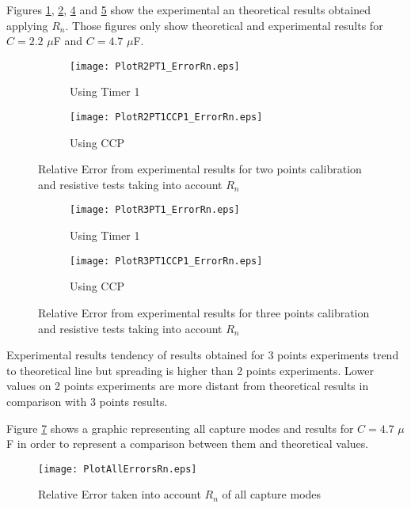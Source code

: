Figures \ref{fig:PlotR2PT1ErrorRn}, \ref{fig:PlotR2PT1CCP1ErrorRn}, \ref{fig:PlotR3PT1ErrorRn} and \ref{fig:PlotR3PT1CCP1ErrorRn} show the experimental an theoretical results obtained applying $R_{n}$. Those figures only show theoretical and experimental results for $C=2.2$ $\mu$F and $C=4.7$ $\mu$F.
\medskip

\begin{figure}[H]
\centering
	\begin{subfigure}{0.75\textwidth}
	\texttt{[image: PlotR2PT1\_ErrorRn.eps]}
	\caption{Using Timer 1}
	\label{fig:PlotR2PT1ErrorRn}
	\end{subfigure}
	\begin{subfigure}{0.75\textwidth}
	\texttt{[image: PlotR2PT1CCP1\_ErrorRn.eps]}
	\caption{Using CCP}
	\label{fig:PlotR2PT1CCP1ErrorRn}
	\end{subfigure}
\caption{Relative Error from experimental results for two points calibration and resistive tests taking into account $R_{n}$}
\label{fig:RelativeErrorRnResistive2P}
\end{figure}

\begin{figure}[H]
\centering
    \begin{subfigure}{0.75\textwidth}
	\texttt{[image: PlotR3PT1\_ErrorRn.eps]}
	\caption{Using Timer 1}
	\label{fig:PlotR3PT1ErrorRn}
	\end{subfigure}
	\begin{subfigure}{0.75\textwidth}
	\texttt{[image: PlotR3PT1CCP1\_ErrorRn.eps]}
	\caption{Using CCP}
	\label{fig:PlotR3PT1CCP1ErrorRn}
	\end{subfigure}
\caption{Relative Error from experimental results for three points calibration and resistive tests taking into account $R_{n}$}
\label{fig:RelativeErrorRnResistive3P}
\end{figure}

Experimental results tendency of results obtained for 3 points experiments trend to theoretical line but spreading is higher than 2 points experiments. Lower values on 2 points experiments are more distant from theoretical results in comparison with 3 points results.
\medskip

Figure \ref{fig:PlotAllErrorsRn} shows a graphic representing all capture modes and results for $C=4.7$ $\mu$F in order to represent a comparison between them and theoretical values.

\begin{figure}[H]
\centering
\texttt{[image: PlotAllErrorsRn.eps]}
\caption{Relative Error taken into account $R_{n}$ of all capture modes}
\label{fig:PlotAllErrorsRn}
\end{figure}

